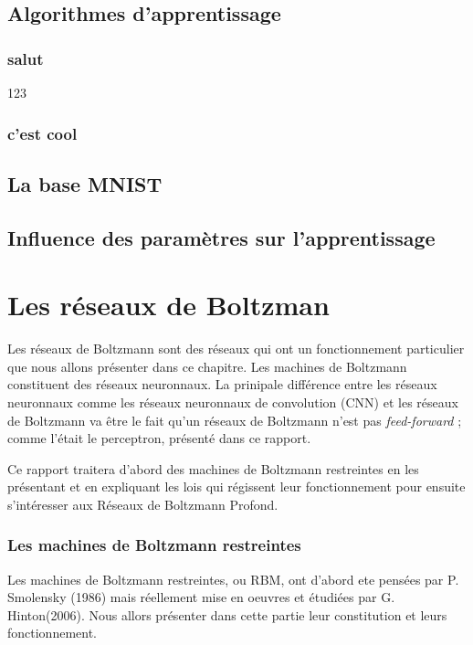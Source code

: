 \documentclass[a4paper,twoside]{report}
\begin{document}
\chapter{Algorithmes d'apprentissage}

\section{salut}

123


\section{c'est cool}


\chapter{La base MNIST}

\chapter{Influence des paramètres sur l'apprentissage}

\part{Les réseaux de Boltzman}

Les réseaux de Boltzmann sont des réseaux qui ont un fonctionnement
particulier que nous allons présenter dans ce chapitre. Les machines de
Boltzmann constituent des réseaux neuronnaux. La prinipale différence entre
les réseaux neuronnaux comme les réseaux neuronnaux de convolution (CNN) et
les  réseaux de Boltzmann va être le fait qu'un réseaux de Boltzmann n'est
pas \textit{feed-forward} ; comme l'était le perceptron, présenté dans ce
rapport.

Ce rapport traitera d'abord des machines de Boltzmann restreintes en les
présentant et en expliquant les lois qui régissent leur fonctionnement pour
ensuite s'intéresser aux Réseaux de Boltzmann Profond.

\section{Les machines de Boltzmann restreintes}

Les machines de Boltzmann restreintes, ou RBM, ont d'abord ete
pensées par P. Smolensky (1986) mais réellement mise en oeuvres et
étudiées par G.
Hinton(2006). Nous allors présenter dans cette partie leur constitution et
leurs fonctionnement.
\end{document}
